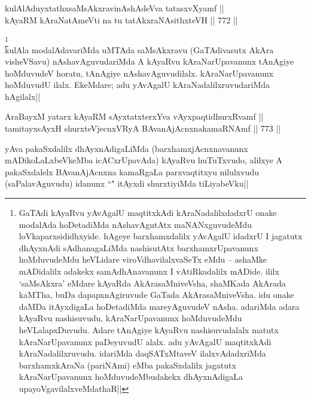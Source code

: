 \begin{shl}
kulAlAduyxtathxsaMsAkxravinAshAdeVva tatasxvXyamf || \\
kAyaRM kAraNatAmeVti na tu tatAkxraNAsithxteVH ||  772 ||  
\end{shl}

\begin{artha} 
\footnote[1]{GaTAdi kAyaRvu yAvAgalU maqtitxkAdi kAraNadalilxdadxrU 
onake modalAda hoDetadiMda nAshavAgutAtx maNANxguvudeMdu 
loVkaparxsididhxyide. hAgeye barxhamxdalilx yAvAgalU idadxrU I 
jagatutx dhAyxnAdi sAdhanagaLiMda nashisutAtx barxhamxrUpavanunx 
hoMduvudeMdu heVLidare viroVdhavilalxvaSeTx eMdu -- ashaMke mADidalilx 
adakekx samAdhAnavanunx I vAtiRkadalilx mADide. ililx `saMsAkxra' 
eMdare kAyaRda AkArasaMniveVsha, shaMKada AkArada kaMTha, buDa 
dapapxnAgiruvude GaTada AkArasaMniveVsha. idu onake daMDa itAyxdigaLa 
hoDetadiMda mareyAguvudeV nAsha. adariMda adara kAyaRvu nashisuvudu, 
kAraNarUpavanunx hoMduvudeMdu heVLalapxDuvudu. Adare tAnAgiye kAyaRvu 
nashisuvudalalx matutx kAraNarUpavanunx paDeyuvudU alalx. adu yAvAgalU 
maqtitxkAdi kAraNadalilxruvudu. idariMda daqSATxMtaveV 
ilalxvAdadxriMda barxhamxkAraNa (pariNAmi) eMba pakaSxdalilx jagatutx 
kAraNarUpavanunx hoMduvudeMbudakekx dhAyxnAdigaLa 
upayoVgavilalxveMdathaR||}\\
kulAla modalAdavariMda uMTAda saMsAkxravu (GaTAdivasutx AkAra 
visheVSavu) nAshavAguvudariMda A kAyaRvu kAraNarUpavanunx tAnAgiye 
hoMduvudeV horatu, tAnAgiye nAshavAguvudilalx. kAraNarUpavanunx 
hoMduvudU ilalx. EkeMdare; adu yAvAgalU kAraNadalilxruvudariMda 
hAgilalx||
\end{artha}


\begin{shl}
AraBayxM yatarx kAyaRM sAyxtatxterxYva vAyxpaqtidhurxRvamf || \\
tamitayxsAyxH shurxteVjecnxVRyA BAvanAjAcnxnakamaRNAmf ||  773 ||  
\end{shl}

\begin{artha} 
yAva pakaSxdalilx dhAyxnAdigaLiMda (barxhamxjAcnxnavanunx 
mADikoLaLxbeVkeMba icACxrUpavAda) kAyaRvu huTuTxvudo, alilxye A 
pakaSxdalelx BAvanAjAcnxna kamaRgaLa parxvaqtitxyu nilulxvudu 
(saPalavAguvudu) idanunx ``\stext" itAyxdi shurxtiyiMda tiLiyabeVku||
\end{artha}


